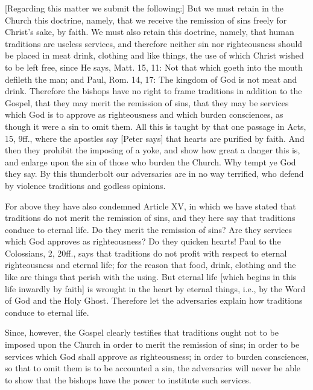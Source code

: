[Regarding this matter we submit the following:] But we must retain
in the Church this doctrine, namely, that we receive the remission of
sins freely for Christ's sake, by faith.  We must also retain this
doctrine, namely, that human traditions are useless services, and
therefore neither sin nor righteousness should be placed in meat
drink, clothing and like things, the use of which Christ wished to be
left free, since He says, Matt. 15, 11: Not that which goeth into the
mouth defileth the man; and Paul, Rom. 14, 17: The kingdom of God is
not meat and drink.  Therefore the bishops have no right to frame
traditions in addition to the Gospel, that they may merit the
remission of sins, that they may be services which God is to approve
as righteousness and which burden consciences, as though it were a
sin to omit them.  All this is taught by that one passage in Acts, 15,
9ff., where the apostles say [Peter says] that hearts are purified
by faith.  And then they prohibit the imposing of a yoke, and show
how great a danger this is, and enlarge upon the sin of those who
burden the Church.  Why tempt ye God they say.  By this thunderbolt
our adversaries are in no way terrified, who defend by violence
traditions and godless opinions.

For above they have also condemned Article XV, in which we have
stated that traditions do not merit the remission of sins, and they
here say that traditions conduce to eternal life.  Do they merit the
remission of sins?  Are they services which God approves as
righteousness?  Do they quicken hearts!  Paul to the Colossians, 2,
20ff., says that traditions do not profit with respect to eternal
righteousness and eternal life; for the reason that food, drink,
clothing and the like are things that perish with the using.  But
eternal life [which begins in this life inwardly by faith] is wrought
in the heart by eternal things, i.e., by the Word of God and the Holy
Ghost.  Therefore let the adversaries explain how traditions conduce
to eternal life.

Since, however, the Gospel clearly testifies that traditions ought
not to be imposed upon the Church in order to merit the remission of
sins; in order to be services which God shall approve as
righteousness; in order to burden consciences, so that to omit them
is to be accounted a sin, the adversaries will never be able to show
that the bishops have the power to institute such services.

